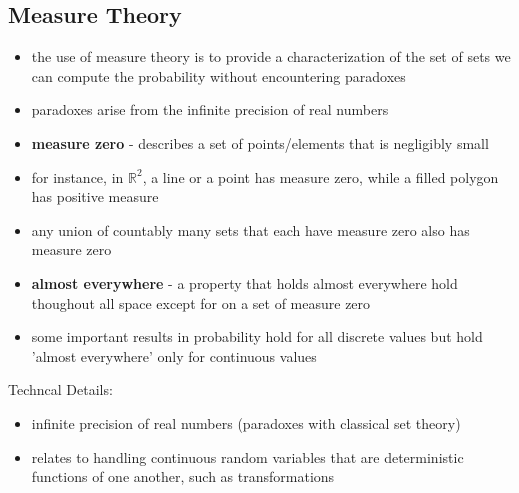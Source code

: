 \documentclass[11pt, twocolumn]{report}
\begin{document}
\subsection{Measure Theory}
\begin{itemize}
  \item the use of measure theory is to provide a characterization of the set
    of sets we can compute the probability without encountering paradoxes
  \item paradoxes arise from the infinite precision of real numbers
  \item \textbf{measure zero} - describes a set of points/elements that is
    negligibly small
  \item for instance, in $\mathbb{R}^2$, a line or a point has measure zero,
    while a filled polygon has positive measure
  \item any union of countably many sets that each have measure zero also has
    measure zero
  \item \textbf{almost everywhere} - a property that holds almost everywhere
    hold thoughout all space except for on a set of measure zero
  \item some important results in probability hold for all discrete values but
    hold 'almost everywhere' only for continuous values
\end{itemize}
Techncal Details:
\begin{itemize}
  \item infinite precision of real numbers (paradoxes with classical set theory)
  \item relates to handling continuous random variables that are deterministic
    functions of one another, such as transformations
\end{itemize}
\end{document}
